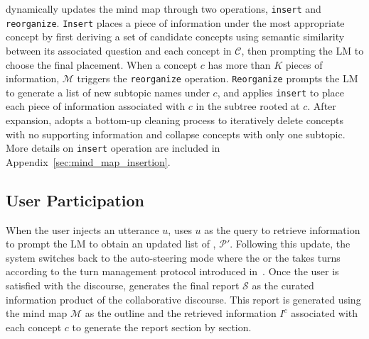 \system dynamically updates the mind map through two operations, \texttt{insert} and \texttt{reorganize}. \texttt{Insert} places a piece of information under the most appropriate concept by first deriving a set of candidate concepts using semantic similarity between its associated question and each concept in $\mathcal{C}$, then prompting the LM to choose the final placement. When a concept $c$ has more than $K$ pieces of information, $\mathcal{M}$ triggers the \texttt{reorganize} operation. \texttt{Reorganize} prompts the LM to generate a list of new subtopic names under $c$, and applies \texttt{insert} to place each piece of information associated with $c$ in the subtree rooted at $c$. After expansion, \system adopts a bottom-up cleaning process to iteratively delete concepts with no supporting information and collapse concepts with only one subtopic. More details on \texttt{insert} operation are included in Appendix~\ref{sec:mind_map_insertion}.



\subsection{User Participation}
\label{sec:human_steering_mode}
When the user injects an utterance $u$, \system uses $u$ as the query to retrieve information to prompt the LM to obtain an updated list of \experts, $\mathcal{P}'$. 
Following this update, the system switches back to the auto-steering mode where the \expert or the \moderator takes turns according to the turn management protocol introduced in~. Once the user is satisfied with the discourse, \system generates the final report $\mathcal{S}$ as the curated information product of the collaborative discourse. This report is generated using the mind map $\mathcal{M}$ as the outline and the retrieved information $I^{c}$ associated with each concept $c$ to generate the report section by section.


